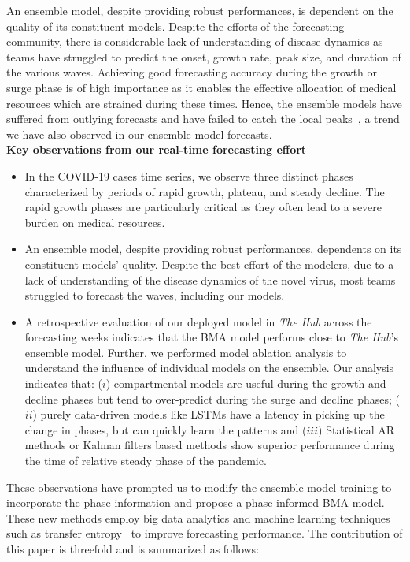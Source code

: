 \documentclass[conference,compsoc]{IEEEtran}
\newcommand{\hub}{\emph{The Hub}}
\begin{document}
 An ensemble model, despite providing robust performances, is dependent on the quality of its constituent models. Despite the efforts of the forecasting community, there is considerable lack of understanding of disease dynamics as teams have struggled to predict the onset, growth rate, peak size, and duration of the various waves. Achieving good forecasting accuracy during the growth or surge phase is of high importance as it enables the effective allocation of medical resources which are strained during these times. Hence, the ensemble models have suffered from outlying forecasts and have failed to catch the local peaks~\cite{ray2021challenges}, a trend we have also observed in our ensemble model forecasts. 
 \\
\textbf{Key observations from our real-time forecasting effort}
\begin{itemize}
    \item In the COVID-19 cases time series, we observe three distinct phases characterized by periods of rapid growth, plateau, and steady decline. The rapid growth phases are particularly critical as they often lead to a severe burden on medical resources.
    \item An ensemble model, despite providing robust performances, dependents on its constituent models' quality. Despite the best effort of the modelers, due to a lack of understanding of the disease dynamics of the novel virus, most teams struggled to forecast the waves, including our models. 
    \item A retrospective evaluation of our deployed model \cite{allmodels} in \hub{} across the forecasting weeks indicates that the BMA model performs close to \hub's ensemble model. Further, we performed model ablation analysis to understand the influence of individual models on the ensemble. Our analysis indicates that: ($i$) compartmental models are useful during the growth and decline phases but tend to over-predict during the surge and decline phases; ($ii$) purely data-driven models like LSTMs have a latency in picking up the change in phases, but can quickly learn the patterns and ($iii$) Statistical AR methods or Kalman filters based methods show superior performance during the time of relative steady phase of the pandemic.
    
\end{itemize}

These observations have prompted us to modify the ensemble model training to incorporate the phase information and propose a phase-informed BMA model. These new methods employ big data analytics and machine learning techniques such as transfer entropy~\cite{schreiber2000measuring} to improve forecasting performance. The contribution of this paper is threefold and is summarized as follows:
\end{document}
